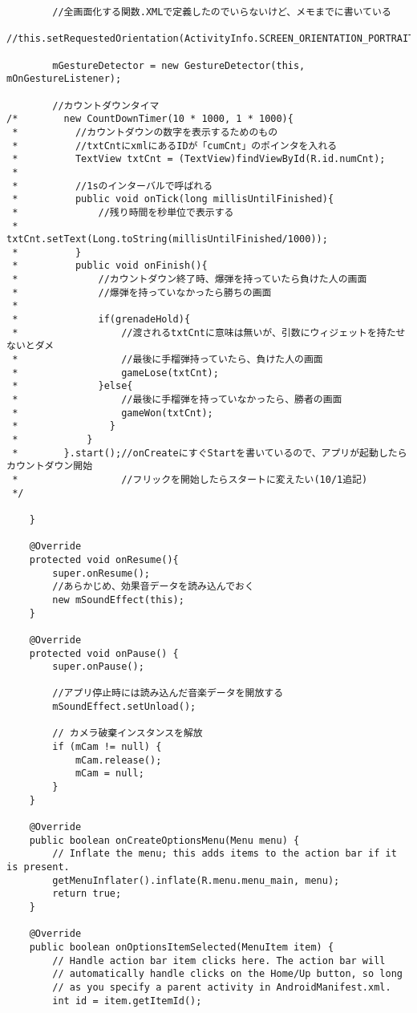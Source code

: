 \documentclass[11pt,a4j]{jarticle}
\begin{document}
\begin{verbatim}
        //全画面化する関数.XMLで定義したのでいらないけど、メモまでに書いている
        //this.setRequestedOrientation(ActivityInfo.SCREEN_ORIENTATION_PORTRAIT);

        mGestureDetector = new GestureDetector(this, mOnGestureListener);

        //カウントダウンタイマ
/*        new CountDownTimer(10 * 1000, 1 * 1000){
 *          //カウントダウンの数字を表示するためのもの
 *          //txtCntにxmlにあるIDが「cumCnt」のポインタを入れる
 *          TextView txtCnt = (TextView)findViewById(R.id.numCnt);
 *
 *          //1sのインターバルで呼ばれる
 *          public void onTick(long millisUntilFinished){
 *              //残り時間を秒単位で表示する
 *              txtCnt.setText(Long.toString(millisUntilFinished/1000));
 *          }
 *          public void onFinish(){
 *              //カウントダウン終了時、爆弾を持っていたら負けた人の画面
 *              //爆弾を持っていなかったら勝ちの画面
 *
 *              if(grenadeHold){
 *                  //渡されるtxtCntに意味は無いが、引数にウィジェットを持たせないとダメ
 *                  //最後に手榴弾持っていたら、負けた人の画面
 *                  gameLose(txtCnt);
 *              }else{
 *                  //最後に手榴弾を持っていなかったら、勝者の画面
 *                  gameWon(txtCnt);
 *                }
 *            }
 *        }.start();//onCreateにすぐStartを書いているので、アプリが起動したらカウントダウン開始
 *                  //フリックを開始したらスタートに変えたい(10/1追記)
 */

    }

    @Override
    protected void onResume(){
        super.onResume();
        //あらかじめ、効果音データを読み込んでおく
        new mSoundEffect(this);
    }

    @Override
    protected void onPause() {
        super.onPause();
        
        //アプリ停止時には読み込んだ音楽データを開放する
        mSoundEffect.setUnload();

        // カメラ破棄インスタンスを解放
        if (mCam != null) {
            mCam.release();
            mCam = null;
        }
    }

    @Override
    public boolean onCreateOptionsMenu(Menu menu) {
        // Inflate the menu; this adds items to the action bar if it is present.
        getMenuInflater().inflate(R.menu.menu_main, menu);
        return true;
    }

    @Override
    public boolean onOptionsItemSelected(MenuItem item) {
        // Handle action bar item clicks here. The action bar will
        // automatically handle clicks on the Home/Up button, so long
        // as you specify a parent activity in AndroidManifest.xml.
        int id = item.getItemId();


\end{verbatim}
\end{document}
